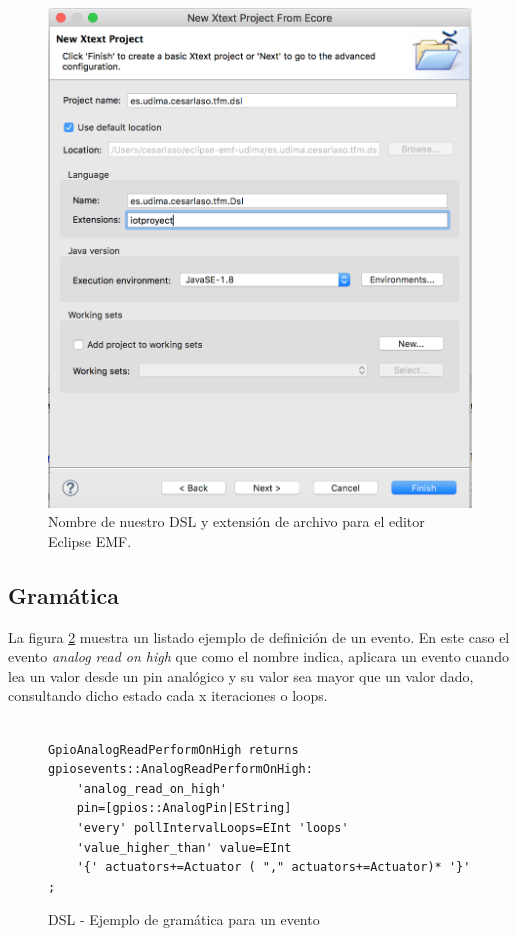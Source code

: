 \begin{figure}
	\centering
    \includegraphics[scale=0.4]{images/emf_capturas/xtext-desde-ecore-paso3.png}
    \sourcepropia{}
    \caption{Nombre de nuestro DSL y extensión de archivo para el editor Eclipse EMF.}
    \label{fig:xtext_desde_ecore3}
\end{figure}


\subsection{Gramática}

La figura \ref{fig:xtext_dsl_definicio_ejemplo} muestra un listado ejemplo de definición de un evento. En este caso el evento \textit{analog read on high} que como el nombre indica, aplicara un evento cuando lea un valor desde un pin analógico y su valor sea mayor que un valor dado, consultando dicho estado cada x iteraciones o loops.

\begin{figure}
	\centering

\begin{lstlisting}

GpioAnalogReadPerformOnHigh returns gpiosevents::AnalogReadPerformOnHigh:
	'analog_read_on_high'
	pin=[gpios::AnalogPin|EString]
	'every' pollIntervalLoops=EInt 'loops'
	'value_higher_than' value=EInt
	'{' actuators+=Actuator ( "," actuators+=Actuator)* '}'
;

\end{lstlisting}
\sourcepropia{}
\caption{DSL - Ejemplo de gramática para un evento}
\label{fig:xtext_dsl_definicio_ejemplo}
\end{figure}

